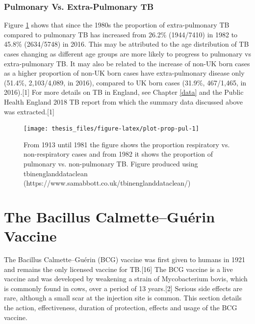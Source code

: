 \documentclass[11pt,twoside]{bristolthesis}
\begin{document}
  \hypertarget{pulmonary-vs.-extra-pulmonary-tb}{%
  \subsubsection{Pulmonary Vs. Extra-Pulmonary TB}\label{pulmonary-vs.-extra-pulmonary-tb}}
  
  Figure \ref{fig:plot-prop-pul} shows that since the 1980s the proportion of extra-pulmonary TB compared to pulmonary TB has increased from 26.2\% (1944/7410) in 1982 to 45.8\% (2634/5748) in 2016. This may be attributed to the age distribution of TB cases changing as different age groups are more likely to progress to pulmonary vs extra-pulmonary TB. It may also be related to the increase of non-UK born cases as a higher proportion of non-UK born cases have extra-pulmonary disease only (51.4\%, 2,103/4,089, in 2016), compared to UK born cases (31.9\%, 467/1,465, in 2016).{[}1{]} For more details on TB in England, see Chapter \ref{data} and the Public Health England 2018 TB report from which the summary data discussed above was extracted.{[}1{]}
  \begin{figure}
  
  {\centering \texttt{[image: thesis\_files/figure-latex/plot-prop-pul-1]} 
  
  }
  
  \caption{From 1913 until 1981 the figure shows the proportion respiratory vs. non-respiratory cases and from 1982 it shows the proportion of pulmonary vs. non-pulmonary TB. Figure produced using tbinenglanddataclean (https://www.samabbott.co.uk/tbinenglanddataclean/)}\label{fig:plot-prop-pul}
  \end{figure}
  \hypertarget{the-bacillus-calmetteguerin-vaccine}{%
  \section{The Bacillus Calmette--Guérin Vaccine}\label{the-bacillus-calmetteguerin-vaccine}}
  
  The Bacillus Calmette--Guérin (BCG) vaccine was first given to humans in 1921 and remains the only licensed vaccine for TB.{[}16{]} The BCG vaccine is a live vaccine and was developed by weakening a strain of Mycobacterium bovis, which is commonly found in cows, over a period of 13 years.{[}2{]} Serious side effects are rare, although a small scar at the injection site is common. This section details the action, effectiveness, duration of protection, effects and usage of the BCG vaccine.
  
\end{document}
